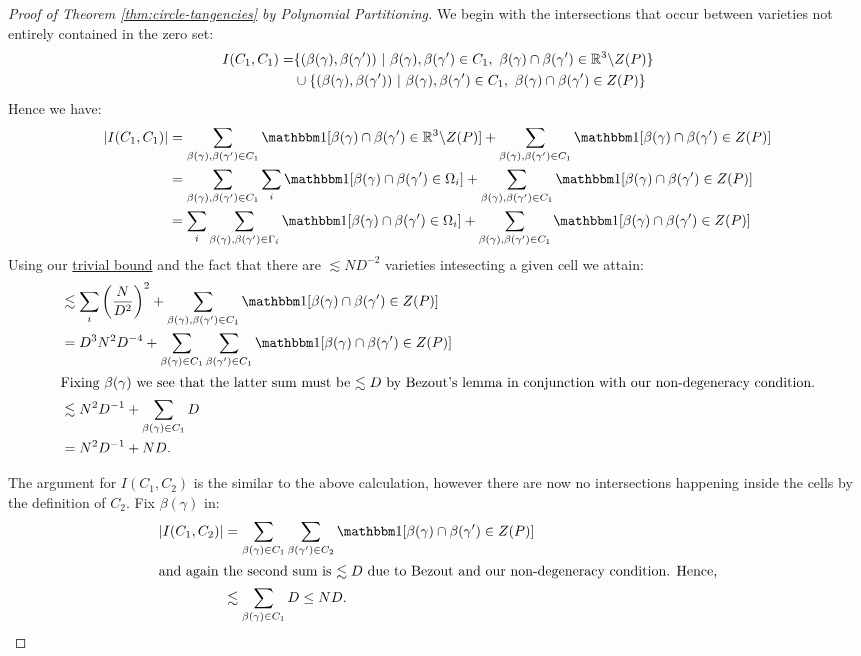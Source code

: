 \begin{proof}[Proof of Theorem \ref{thm:circle-tangencies} by Polynomial Partitioning]
We begin with the intersections that occur between varieties not entirely contained in the zero set:
\begin{align*}
    I(C_1,C_1) = &\{ (\beta(\gamma), \beta(\gamma')) \ |  \ \beta(\gamma), \beta(\gamma') \in C_1, \ \beta(\gamma) \cap \beta(\gamma') \in \RR^3 \backslash Z(P)\} \\
                & \cup \{ (\beta(\gamma), \beta(\gamma')) \ |  \ \beta(\gamma), \beta(\gamma') \in C_1, \ \beta(\gamma) \cap \beta(\gamma') \in Z(P)\}
\end{align*}
Hence we have:
\begin{align*}
    |I(C_1,C_1)| &= \sum_{\beta(\gamma), \beta(\gamma') \in C_1} \OO[\beta(\gamma) \cap \beta(\gamma') \in \RR^3 \backslash Z(P)] + 
                  \sum_{\beta(\gamma), \beta(\gamma') \in C_1} \OO[\beta(\gamma) \cap \beta(\gamma') \in Z(P)] \\
                 &= \sum_{\beta(\gamma), \beta(\gamma') \in C_1} \sum_i \OO[\beta(\gamma) \cap \beta(\gamma') \in \Omega_i] +
                 \sum_{\beta(\gamma), \beta(\gamma') \in C_1} \OO[\beta(\gamma) \cap \beta(\gamma') \in Z(P)]\\
                 &= \sum_i \sum_{\beta(\gamma), \beta(\gamma') \in \Gamma_i}  \OO[\beta(\gamma) \cap \beta(\gamma') \in \Omega_i] +
                  \sum_{\beta(\gamma), \beta(\gamma') \in C_1} \OO[\beta(\gamma) \cap \beta(\gamma') \in Z(P)]
\end{align*}
Using our \hyperref[thm:trivial-circle-bound]{trivial bound} and the fact that there are $\lesssim ND^{-2}$ varieties intesecting a given cell we attain:
\begin{align*}
                 &\lesssim \sum_i \left(\frac{N}{D^2}\right)^2 + \sum_{\beta(\gamma), \beta(\gamma') \in C_1} \OO[\beta(\gamma) \cap \beta(\gamma') \in Z(P)] \\
                 &= D^3 N^2 D^{-4} + \sum_{\beta(\gamma)\in C_1} \sum_{\beta(\gamma') \in C_1} \OO[\beta(\gamma) \cap \beta(\gamma') \in Z(P)]\\
                 \intertext{Fixing $\beta(\gamma)$ we see that the latter sum must be $\lesssim D$ by Bezout's lemma in conjunction with our non-degeneracy condition.}
                 &\lesssim  N^2 D^{-1} + \sum_{\beta(\gamma)\in C_1} D \\
                 &= N^2D^{-1} + ND.
\end{align*}

The argument for $I(C_1,C_2)$ is the similar to the above calculation, however there are now no intersections happening inside the cells by the definition of $C_2$.
 Fix $\beta(\gamma)$ in:
\begin{align*}
    |I(C_1,C_2)| &= \sum_{\beta(\gamma)\in C_1} \sum_{\beta(\gamma') \in C_2} \OO[\beta(\gamma) \cap \beta(\gamma') \in Z(P)] \\
    \intertext{and again the second sum is $\lesssim D$ due to Bezout and our non-degeneracy condition. Hence,}
    & \lesssim \sum_{\beta(\gamma)\in C_1} D \leq ND.
\end{align*}


\end{proof}
